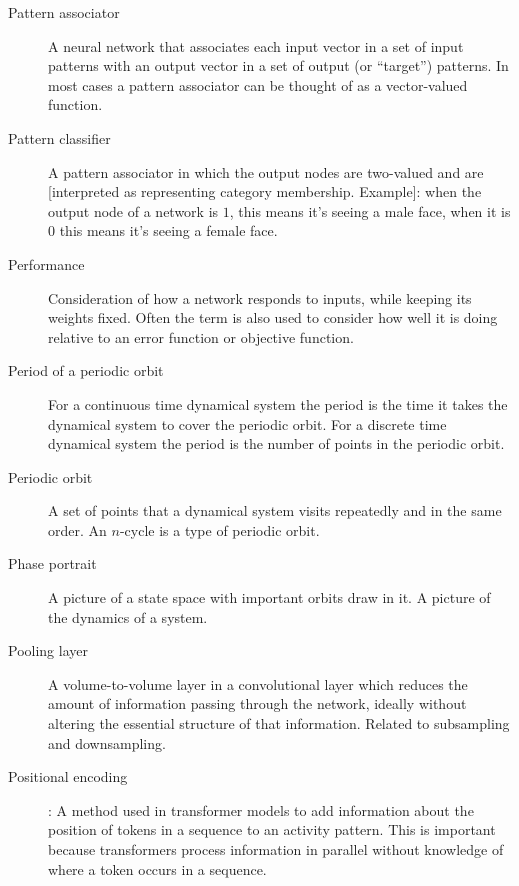 \begin{description}
\item[Pattern associator] A neural network that associates each input vector in a set of input patterns with an output vector in a set of output (or ``target'') patterns. In most cases a pattern associator can be thought of as a vector-valued function. 
	

\item[Pattern classifier] A pattern associator in which the output nodes are two-valued and are [interpreted as representing category membership. Example]: when the output node of a network is $1$, this means it's seeing a male face, when it is $0$ this means it's seeing a female face.


\item[Performance] Consideration of how a network responds to inputs, while keeping its weights fixed.  Often the term is also used to consider how well it is doing relative to an error function or objective function.

\item[Period of a periodic orbit] For a continuous time dynamical system the period is the time it takes the dynamical system to cover the periodic orbit. For a discrete time dynamical system the period is the number of points in the periodic orbit.

\item[Periodic orbit] A set of points that a dynamical system visits repeatedly and in the same order. An $n$-cycle is a type of periodic orbit.

\item[Phase portrait] A picture of a state space with important orbits draw in it. A picture of the dynamics of a system.

\item[Pooling layer] A volume-to-volume layer in a convolutional layer which reduces the amount of information passing through the network, ideally without altering the essential structure of that information. Related to subsampling and downsampling. 

\item[Positional encoding]: A method used in transformer models to add information about the position of tokens in a sequence to an activity pattern. This is important because transformers process information in parallel without knowledge of where a token occurs in a sequence.


\end{description}
